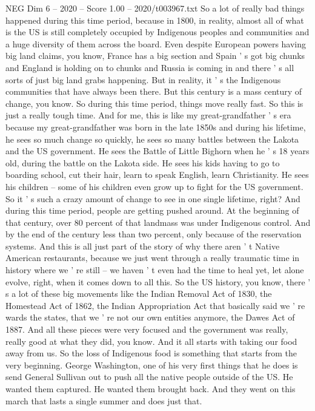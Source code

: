 \begin{textsample}{NEG Dim 6 – 2020 – Score 1.00 – 2020/t003967.txt}
So a lot of really bad things happened during this time period, because in 1800, in reality, almost all of what is the US is still completely occupied by Indigenous peoples and communities and a huge diversity of them across the board.
Even despite European powers having big land claims, you know, France has a big section and Spain ' s got big chunks and England is holding on to chunks and Russia is coming in and there ' s all sorts of just big land grabs happening.
But in reality, it ' s the Indigenous communities that have always been there.
But this century is a mass century of change, you know.
So during this time period, things move really fast.
So this is just a really tough time.
And for me, this is like my great-grandfather ' s era because my great-grandfather was born in the late 1850s and during his lifetime, he sees so much change so quickly, he sees so many battles between the Lakota and the US government.
He sees the Battle of Little Bighorn when he ' s 18 years old, during the battle on the Lakota side.
He sees his kids having to go to boarding school, cut their hair, learn to speak English, learn Christianity.
He sees his children -- some of his children even grow up to fight for the US government.
So it ' s such a crazy amount of change to see in one single lifetime, right?
And during this time period, people are getting pushed around.
At the beginning of that century, over 80 percent of that landmass was under Indigenous control.
And by the end of the century less than two percent, only because of the reservation systems.
And this is all just part of the story of why there aren ' t Native American restaurants, because we just went through a really traumatic time in history where we ' re still -- we haven ' t even had the time to heal yet, let alone evolve, right, when it comes down to all this.
So the US history, you know, there ' s a lot of these big movements like the Indian Removal Act of 1830, the Homestead Act of 1862, the Indian Appropriation Act that basically said we ' re wards the states, that we ' re not our own entities anymore, the Dawes Act of 1887.
And all these pieces were very focused and the government was really, really good at what they did, you know.
And it all starts with taking our food away from us.
So the loss of Indigenous food is something that starts from the very beginning.
George Washington, one of his very first things that he does is send General Sullivan out to push all the native people outside of the US.
He wanted them captured.
He wanted them brought back.
And they went on this march that lasts a single summer and does just that.

\end{textsample}

